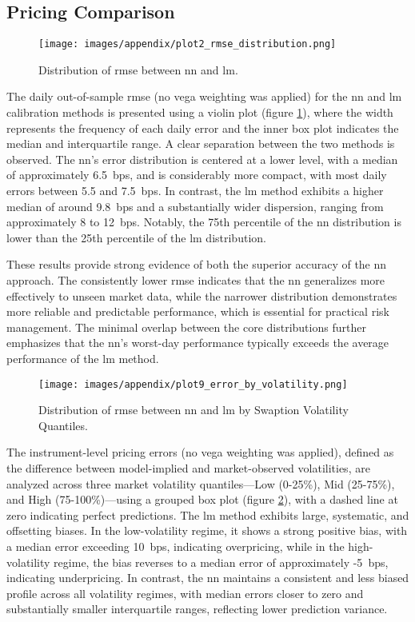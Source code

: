 \subsection{Pricing Comparison}
\begin{figure}[H]
	\centering
	\texttt{[image: images/appendix/plot2\_rmse\_distribution.png]}
	\caption{Distribution of \ac{rmse} between \ac{nn} and \ac{lm}.}
	\label{fig:distribution_rmse_violin plot}
\end{figure}
The daily out-of-sample \ac{rmse} (no vega weighting was applied) for the \ac{nn} and \ac{lm} calibration methods is presented using a violin plot (figure \ref{fig:distribution_rmse_violin plot}), where the width represents the frequency of each daily error and the inner box plot indicates the median and interquartile range. A clear separation between the two methods is observed. The \ac{nn}'s error distribution is centered at a lower level, with a median of approximately 6.5~\ac{bps}, and is considerably more compact, with most daily errors between 5.5 and 7.5~\ac{bps}. In contrast, the \ac{lm} method exhibits a higher median of around 9.8~\ac{bps} and a substantially wider dispersion, ranging from approximately 8 to 12~\ac{bps}. Notably, the 75th percentile of the \ac{nn} distribution is lower than the 25th percentile of the \ac{lm} distribution.

These results provide strong evidence of both the superior accuracy of the \ac{nn} approach. The consistently lower \ac{rmse} indicates that the \ac{nn} generalizes more effectively to unseen market data, while the narrower distribution demonstrates more reliable and predictable performance, which is essential for practical risk management. The minimal overlap between the core distributions further emphasizes that the \ac{nn}'s worst-day performance typically exceeds the average performance of the \ac{lm} method.

\begin{figure}[H]
	\centering
	\texttt{[image: images/appendix/plot9\_error\_by\_volatility.png]}
	\caption{Distribution of \ac{rmse} between \ac{nn} and \ac{lm} by Swaption Volatility Quantiles.}
	\label{fig:distribution_rmse_by_swaption_volatility_quantile}
\end{figure}
The instrument-level pricing errors (no vega weighting was applied), defined as the difference between model-implied and market-observed volatilities, are analyzed across three market volatility quantiles—Low (0-25\%), Mid (25-75\%), and High (75-100\%)—using a grouped box plot (figure \ref{fig:distribution_rmse_by_swaption_volatility_quantile}), with a dashed line at zero indicating perfect predictions. The \ac{lm} method exhibits large, systematic, and offsetting biases. In the low-volatility regime, it shows a strong positive bias, with a median error exceeding 10~\ac{bps}, indicating overpricing, while in the high-volatility regime, the bias reverses to a median error of approximately -5~\ac{bps}, indicating underpricing. In contrast, the \ac{nn} maintains a consistent and less biased profile across all volatility regimes, with median errors closer to zero and substantially smaller interquartile ranges, reflecting lower prediction variance.

